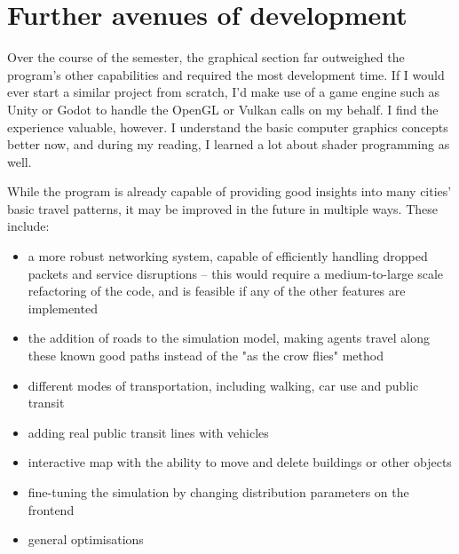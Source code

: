 \chapter{Further avenues of development}

Over the course of the semester, the graphical section far outweighed the program's other capabilities and required the most development time. If I would ever start a similar project from scratch, I'd make use of a game engine such as Unity or Godot to handle the OpenGL or Vulkan calls on my behalf. I find the experience valuable, however. I understand the basic computer graphics concepts better now, and during my reading, I learned a lot about shader programming as well.

While the program is already capable of providing good insights into many cities' basic travel patterns, it may be improved in the future in multiple ways. These include:
\begin{itemize}
    \item a more robust networking system, capable of efficiently handling dropped packets and service disruptions -- this would require a medium-to-large scale refactoring of the code, and is feasible if any of the other features are implemented
    \item the addition of roads to the simulation model, making agents travel along these known good paths instead of the "as the crow flies" method
    \item different modes of transportation, including walking, car use and public transit
    \item adding real public transit lines with vehicles 
    \item interactive map with the ability to move and delete buildings or other objects
    \item fine-tuning the simulation by changing distribution parameters on the frontend
    \item general optimisations
\end{itemize}